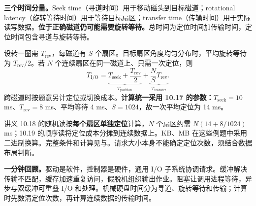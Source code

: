 \textbf{三个时间分量。}Seek time（寻道时间）用于移动磁头到目标磁道；rotational latency（旋转等待时间）用于等待目标扇区；transfer time（传输时间）用于实际读写数据。\textbf{位于正确磁道仍可能需要旋转等待。}总时间为定位时间加传输时间，定位时间包含寻道与旋转等待。

设转一圈需 $T_{\mathrm{rev}}$，每磁道有 $S$ 个扇区。目标扇区角度均匀分布时，平均旋转等待为 $T_{\mathrm{rev}}/2$。若 $N$ 个连续扇区在同一磁道上、只需一次定位，则
\[
  \boxed{T_{\mathrm{I/O}}=
  \underbrace{T_{\mathrm{seek}}+\frac{T_{\mathrm{rev}}}{2}}_{T_{\mathrm{position}}}
  +\underbrace{\frac{N}{S}T_{\mathrm{rev}}}_{T_{\mathrm{transfer}}}}.
\]
跨磁道时按题意另计定位或切换成本。\textbf{计算统一采用 10.17 的参数：}$T_{\mathrm{seek}}=10$ ms、$T_{\mathrm{rev}}=8$ ms、平均等待 4 ms、$S=1024$，故一次平均定位为 14 ms。

讲义 10.18 的随机读按\textbf{每个扇区单独定位}计算，$N$ 个扇区约需 $N(14+8/1024)$ ms；10.19 的顺序读将定位成本分摊到连续数据上。KB、MB 在这些例题中采用二进制换算。完整条件和计算见与。请求大小本身不能确定定位次数，须结合数据布局判断。

\textbf{一分钟回顾。}驱动是软件，控制器是硬件，通用 I/O 子系统协调请求。缓冲解决传输不匹配，缓存加速重复访问，假脱机组织输出作业。阻塞让调用进程等待，异步与双缓冲可重叠 I/O 和处理。机械硬盘时间分为寻道、旋转等待和传输；计算时先数清定位次数，再计算连续数据的传输时间。
\endgroup
